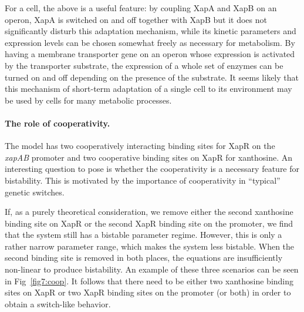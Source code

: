 \documentclass[10pt,letterpaper]{article}
\begin{document}
For a cell, the above is a useful feature: by coupling XapA and XapB on an
operon, XapA is switched on and off together with XapB but it does not
significantly disturb this adaptation mechanism, while its kinetic
parameters and expression levels can be chosen 
somewhat freely as necessary for metabolism. By
having a membrane transporter gene on an operon whose expression is
activated by the transporter substrate, the expression of a whole set of
enzymes can be turned on and off depending on the presence of the substrate.
It seems likely that this mechanism of short-term adaptation of a single cell to
its environment may be used by cells for many metabolic processes.

\paragraph*{The role of cooperativity.} 
The model has two cooperatively interacting binding sites for XapR on the
\emph{xapAB} promoter and two cooperative binding sites on XapR for
xanthosine. An interesting question to pose is whether the cooperativity is
a necessary feature for bistability. This is motivated by the importance of
cooperativity in ``typical'' genetic switches\cite{Gardner2000,Cherry2000}.

If, as a purely theoretical consideration, we remove either the second
xanthosine binding site on XapR or the second XapR binding site on the
promoter, we find that the system still has a bistable parameter regime.
However, this is only a rather narrow parameter range, which makes the system
less bistable. When the second binding site is removed in both places, the
equations are insufficiently non-linear to produce bistability. An example
of these three scenarios can be seen in Fig~\ref{fig7:coop}. It follows that
there need to be either two xanthosine binding sites on XapR or two XapR
binding sites on the promoter (or both) in order to obtain a switch-like
behavior. 
\end{document}
